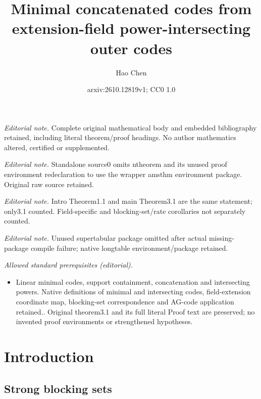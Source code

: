 \documentclass[10pt,a4paper]{article}
\title{Minimal concatenated codes from extension-field power-intersecting outer codes}
\author{Hao Chen}
\date{arxiv:2610.12819v1; CC0 1.0}
\begin{document}
\maketitle
\noindent\textit{Editorial note.} Complete original mathematical body and embedded bibliography retained, including literal theorem/proof headings. No author mathematics altered, certified or supplemented.\par\medskip
\noindent\textit{Editorial note.} Standalone source0 omits ntheorem and its unused proof environment redeclaration to use the wrapper amsthm environment package. Original raw source retained.\par\medskip
\noindent\textit{Editorial note.} Intro Theorem1.1 and main Theorem3.1 are the same statement; only3.1 counted. Field-specific and blocking-set/rate corollaries not separately counted.\par\medskip
\noindent\textit{Editorial note.} Unused supertabular package omitted after actual missing-package compile failure; native longtable environment/package retained.\par\medskip
\noindent\textit{Allowed standard prerequisites (editorial).}\begin{itemize}
\item Linear minimal codes, support containment, concatenation and intersecting powers. Native definitions of minimal and intersecting codes, field-extension coordinate map, blocking-set correspondence and AG-code application retained.. Original theorem3.1 and its full literal Proof text are preserved; no invented proof environments or strengthened hypotheses.
\end{itemize}\medskip
\section{Introduction}


\subsection{Strong blocking sets}
\end{document}
